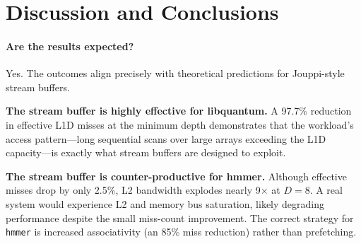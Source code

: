 \documentclass[11pt,letterpaper]{article}
\begin{document}

\section{Discussion and Conclusions}

\paragraph{Are the results expected?} Yes. The outcomes align precisely with
theoretical predictions for Jouppi-style stream buffers.

\textbf{The stream buffer is highly effective for libquantum.} A 97.7\%
reduction in effective L1D misses at the minimum depth demonstrates that the
workload's access pattern---long sequential scans over large arrays exceeding
the L1D capacity---is exactly what stream buffers are designed to exploit.

\textbf{The stream buffer is counter-productive for hmmer.} Although effective
misses drop by only 2.5\%, L2 bandwidth explodes nearly 9$\times$ at $D=8$.
A real system would experience L2 and memory bus saturation, likely degrading
performance despite the small miss-count improvement. The correct strategy for
\texttt{hmmer} is increased associativity (an 85\% miss reduction) rather than
prefetching.
\end{document}
